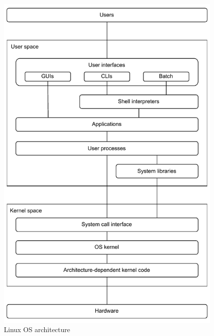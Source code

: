 \begin{figure}[htbp]
    \centering
    \includegraphics{assets/linux_os_structure.pdf}
    \caption{Linux OS architecture}
    \label{fig:linux_os_structure}
\end{figure}

